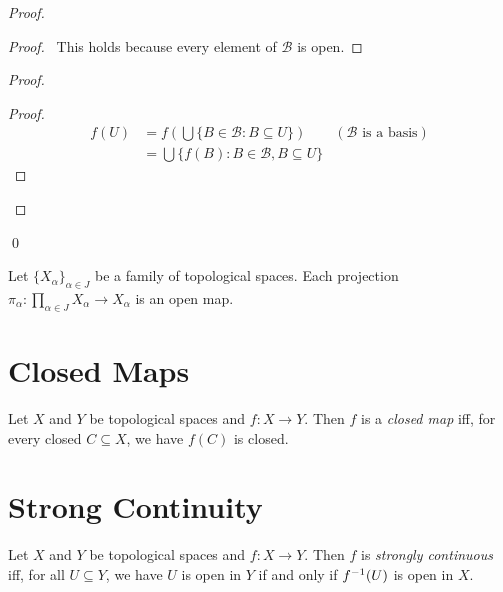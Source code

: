 \begin{proof}
  \pf
  \begin{proof}
    \pf\ This holds because every element of $\mathcal{B}$ is open.
  \end{proof}
  \begin{proof}
    \begin{proof}
      \pf
      \begin{align*}
        f(U) & = f(\bigcup \{ B \in \mathcal{B} : B \subseteq U \}) & (\text{$\mathcal{B}$ is a basis})\\
        & = \bigcup \{ f(B) : B \in \mathcal{B}, B \subseteq U \}
      \end{align*}
    \end{proof}
  \end{proof}
  \qed
\end{proof}

\begin{cor}
  Let $\{ X_\alpha \}_{\alpha \in J}$ be a family of topological spaces. Each projection $\pi_\alpha : \prod_{\alpha \in J} X_\alpha \rightarrow X_\alpha$ is an open map.
\end{cor}

\section{Closed Maps}

\begin{df}
  Let $X$ and $Y$ be topological spaces and $f : X \rightarrow Y$. Then $f$ is a \emph{closed map} iff, for every closed $C \subseteq X$, we have $f(C)$ is closed.
\end{df}

\section{Strong Continuity}

\begin{df}
  Let $X$ and $Y$ be topological spaces and $f : X \rightarrow Y$. Then $f$ is \emph{strongly continuous} iff, for all $U \subseteq Y$, we have $U$ is open in $Y$ if and only if ${f}^{-1}(U)$ is open in $X$.
\end{df}


